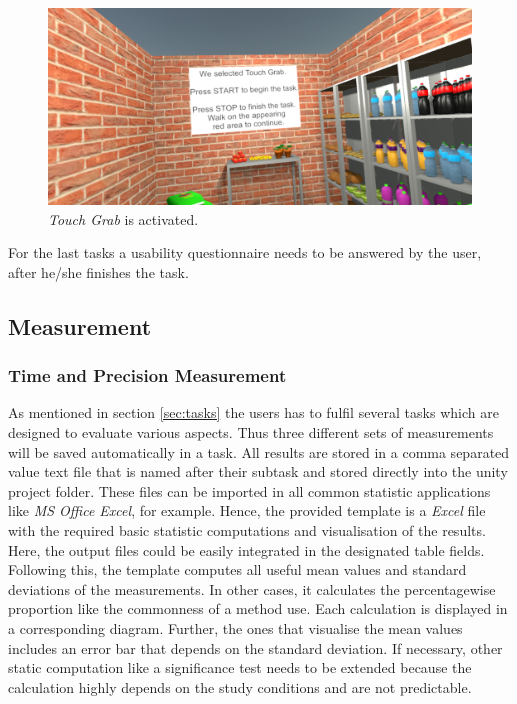 \begin{figure}[H] 
	\center 
	\includegraphics[width=12cm]{Images/TaskWall_2.PNG}
	\caption[\textit{Touch Grab} is activated.]{\textit{Touch Grab} is activated.}
	\label{fig:taskW2}
\end{figure}

For the last tasks a usability questionnaire needs to be answered by the user, after he/she finishes the task. 


\subsection{Measurement} \label{sec:measurement}

\subsubsection{Time and Precision Measurement}
As mentioned in section \ref{sec:tasks} the users has to fulfil several tasks which are designed to evaluate various aspects. Thus three different sets of measurements will be saved automatically in a task. All results are stored in a comma separated value text file that is named after their subtask and stored directly into the unity project folder. These files can be imported in all common statistic applications like \textit{MS Office Excel}, for example. Hence, the provided template is a \textit{Excel} file with the required basic statistic computations and visualisation of the results. Here, the output files could be easily integrated in the designated table fields. Following this, the template computes all useful mean values and standard deviations of the measurements. In other cases, it calculates the percentagewise proportion like the commonness of a method use. Each calculation is displayed in a corresponding diagram. Further, the ones that visualise the mean values includes an error bar that depends on the standard deviation. If necessary, other static computation like a significance test needs to be extended because the calculation highly depends on the study conditions and are not predictable.

